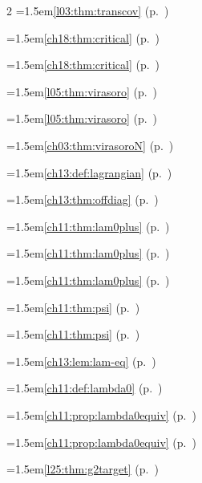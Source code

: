 \begin{multicols}{2}
\hangindent=1.5em\quad \ref{l03:thm:transcov} (p.~\pageref{l03:thm:transcov})\par
\hangindent=1.5em\quad \ref{ch18:thm:critical} (p.~\pageref{ch18:thm:critical})\par
\hangindent=1.5em\quad \ref{ch18:thm:critical} (p.~\pageref{ch18:thm:critical})\par
\hangindent=1.5em\quad \ref{l05:thm:virasoro} (p.~\pageref{l05:thm:virasoro})\par
\hangindent=1.5em\quad \ref{l05:thm:virasoro} (p.~\pageref{l05:thm:virasoro})\par
\hangindent=1.5em\quad \ref{ch03:thm:virasoroN} (p.~\pageref{ch03:thm:virasoroN})\par
\hangindent=1.5em\quad \ref{ch13:def:lagrangian} (p.~\pageref{ch13:def:lagrangian})\par
\hangindent=1.5em\quad \ref{ch13:thm:offdiag} (p.~\pageref{ch13:thm:offdiag})\par
\hangindent=1.5em\quad \ref{ch11:thm:lam0plus} (p.~\pageref{ch11:thm:lam0plus})\par
\hangindent=1.5em\quad \ref{ch11:thm:lam0plus} (p.~\pageref{ch11:thm:lam0plus})\par
\hangindent=1.5em\quad \ref{ch11:thm:lam0plus} (p.~\pageref{ch11:thm:lam0plus})\par
\hangindent=1.5em\quad \ref{ch11:thm:psi} (p.~\pageref{ch11:thm:psi})\par
\hangindent=1.5em\quad \ref{ch11:thm:psi} (p.~\pageref{ch11:thm:psi})\par
\hangindent=1.5em\quad \ref{ch13:lem:lam-eq} (p.~\pageref{ch13:lem:lam-eq})\par
\hangindent=1.5em\quad \ref{ch11:def:lambda0} (p.~\pageref{ch11:def:lambda0})\par
\hangindent=1.5em\quad \ref{ch11:prop:lambda0equiv} (p.~\pageref{ch11:prop:lambda0equiv})\par
\hangindent=1.5em\quad \ref{ch11:prop:lambda0equiv} (p.~\pageref{ch11:prop:lambda0equiv})\par
\hangindent=1.5em\quad \ref{l25:thm:g2target} (p.~\pageref{l25:thm:g2target})\par

\end{multicols}
